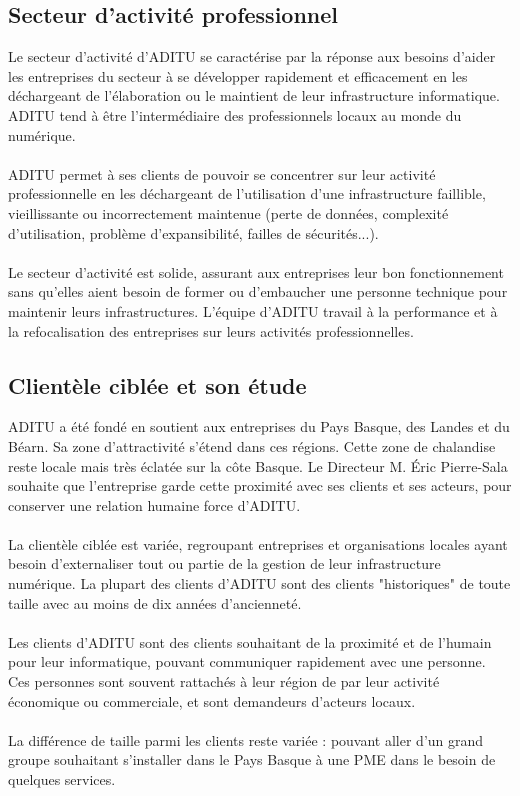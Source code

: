 \begin{sloppypar}
\subsection{Secteur d'activité professionnel}

Le secteur d'activité d'ADITU se caractérise par la réponse aux besoins d'aider les entreprises du secteur à se développer rapidement et efficacement en les déchargeant de l'élaboration ou le maintient de leur infrastructure informatique. ADITU tend à être l'intermédiaire des professionnels locaux au monde du numérique.
\\ \\
ADITU permet à ses clients de pouvoir se concentrer sur leur activité professionnelle en les déchargeant de l'utilisation d'une infrastructure faillible, vieillissante ou incorrectement maintenue (perte de données, complexité d'utilisation, problème d'expansibilité, failles de sécurités...).  
\\ \\
Le secteur d'activité est solide, assurant aux entreprises leur bon fonctionnement sans qu'elles aient besoin de former ou d'embaucher une personne technique pour maintenir leurs infrastructures. L'équipe d'ADITU travail à la performance et à la refocalisation des entreprises sur leurs activités professionnelles.

\subsection{Clientèle ciblée et son étude}

ADITU a été fondé en soutient aux entreprises du Pays Basque, des Landes et du Béarn. Sa zone d'attractivité s'étend dans ces régions. Cette zone de chalandise reste locale mais très éclatée sur la côte Basque. Le Directeur M. Éric Pierre-Sala souhaite que l'entreprise garde cette proximité avec ses clients et ses acteurs, pour conserver une relation humaine force d'ADITU.
\\ \\
La clientèle ciblée est variée, regroupant entreprises et organisations locales ayant besoin d'externaliser tout ou partie de la gestion de leur infrastructure numérique. La plupart des clients d'ADITU sont des clients "historiques" de toute taille avec au moins de dix années d'ancienneté.
\\ \\
Les clients d'ADITU sont des clients souhaitant de la proximité et de l'humain pour leur informatique, pouvant communiquer rapidement avec une personne. Ces personnes sont souvent rattachés à leur région de par leur activité économique ou commerciale, et sont demandeurs d'acteurs locaux.
\\ \\
La différence de taille parmi les clients reste variée : pouvant aller d'un grand groupe souhaitant s'installer dans le Pays Basque à une PME dans le besoin de quelques services.


\end{sloppypar}
